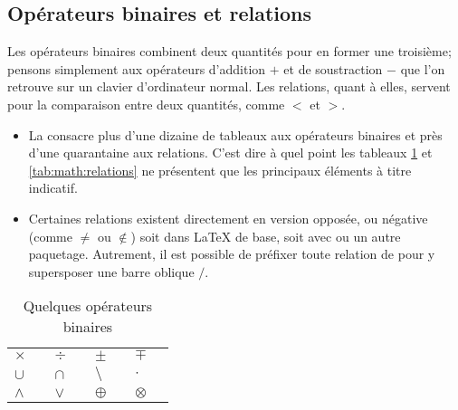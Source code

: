 \subsection{Opérateurs binaires et relations}
\label{sec:math:symboles:binaires+relations}

Les opérateurs binaires combinent deux quantités pour en former une
troisième; pensons simplement aux opérateurs d'addition $+$ et de
soustraction $-$ que l'on retrouve sur un clavier d'ordinateur normal.
Les relations, quant à elles, servent pour la comparaison entre deux
quantités, comme  $<$ et $>$.

\begin{itemize}
\item La %
  consacre plus d'une dizaine de tableaux aux opérateurs binaires et
  près d'une quarantaine aux relations. C'est dire à quel point les
  tableaux \ref{tab:math:binaires} et \ref{tab:math:relations} ne
  présentent que les principaux éléments à titre indicatif.
\item Certaines relations existent directement en version opposée, ou
  négative (comme $\neq$ ou $\notin$) soit dans {\LaTeX} de base, soit
  avec  ou un autre paquetage. Autrement, il est possible
  de préfixer toute relation de \cmd{\not} pour y supersposer une
  barre oblique $/$.
\end{itemize}

\begin{table}
  \caption{Quelques opérateurs binaires}
  \label{tab:math:binaires}
  \begin{tabularx}{1.0\linewidth}{lXlXlXlX}
    $\times$    & \cmd{\times} &
    $\div$      & \cmd{\div}   &
    $\pm$       & \cmd{\pm}    &
    $\mp$       & \cmd{\mp}    \\
    $\cup$      & \cmd{\cup} &
    $\cap$      & \cmd{\cap} &
    $\setminus$ & \cmd{\setminus} &
    $\cdot$     & \cmd{\cdot}  \\
    $\wedge$    & \cmd{\wedge} &
    $\vee$      & \cmd{\vee} &
    $\oplus$    & \cmd{\oplus} &
    $\otimes$   & \cmd{\otimes}
  \end{tabularx}
\end{table}

